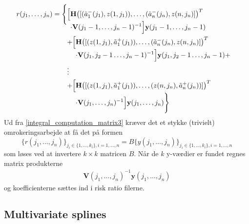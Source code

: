 \documentclass[a4paper, 12pt]{memoir}
\begin{document}
\begin{align}
r(j_1, \dots, j_n)&=\Biggl\{\begin{lgathered}[t]\Bigl[\begin{lgathered}[t] \mathbf{H}\bigl([(\tilde a_1^-(j_1), z(1,j_1)), \dots, (\tilde a_n^-(j_n), z(n,j_n)]\bigr)^T\\
\cdot \mathbf{V}(j_1-1, \dots, j_n-1)^{-1} \Bigr] \mathbf{y}(j_1-1, \dots, j_n-1) \end{lgathered}\\
+
\Bigl[\begin{lgathered}[t] \mathbf{H}\bigl([(z(1,j_1), \tilde a_1^+(j_1)), \dots, (\tilde a_n^-(j_n), z(n,j_n)]\bigr)^T\\
\cdot \mathbf{V}(j_1,j_2-1 \dots, j_n-1)^{-1} \Bigr] \mathbf{y}(j_1,j_2-1 \dots, j_n-1)+ \end{lgathered} \\
\vdots\\
+\Bigl[\begin{lgathered}[t] \mathbf{H}\bigl([( z(1,j_1), \tilde a_1^+(j_1)), \dots, (z(n,j_n), \tilde a_n^+(j_n))]\bigr)^T\\
\cdot \mathbf{V}(j_1, \dots, j_n)^{-1} \Bigr] \mathbf{y}(j_1, \dots, j_n) \Biggr\}\end{lgathered}\\
\end{lgathered}\label{integral_computation_matrix3}
\end{align}
Ud fra \eqref{integral_computation_matrix3} kræver det et stykke (trivielt) omrokeringsarbejde at få det på formen
\begin{equation}
\bigl\{r(j_1, \dots, j_n)\bigr\}_{j_i\in\{1, \dots, k_i\}, i=1, \dots, n}=B\bigl\{y(j_1, \dots, j_n)\bigr\}_{j_i\in\{1, \dots, k_i\}, i=1, \dots, n}
\end{equation}
som løses ved at invertere $k\times k$ matricen $B$. Når de $k$ y-værdier er fundet regnes matrix produkterne
\begin{align}
\mathbf{V}(j_1, \dots, j_n)^{-1} \mathbf{y}(j_1, \dots, j_n)
\end{align}
og koefficienterne sættes ind i risk ratio filerne.

\subsection{Multivariate splines}
\end{document}
